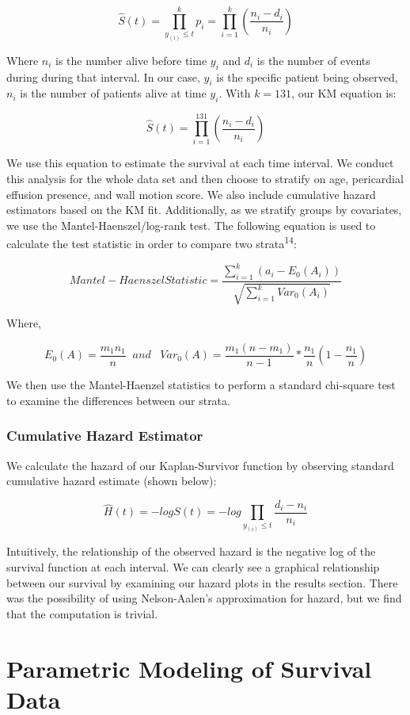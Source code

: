\documentclass[
]{article}
\begin{document}
\[ \hat{S}(t) = \prod_{y_{(i)}\leq{t}}^{k} p_i = \prod_{i=1}^{k} (\frac{n_i -d_i}{n_i}) \]

Where \(n_i\) is the number alive before time \(y_i\) and \(d_i\) is the
number of events during during that interval. In our case, \(y_i\) is
the specific patient being observed, \(n_i\) is the number of patients
alive at time \(y_i\). With \(k = 131\), our KM equation is:

\[ \hat{S}(t) = \prod_{i=1}^{131} (\frac{n_i -d_i}{n_i}) \]

We use this equation to estimate the survival at each time interval. We
conduct this analysis for the whole data set and then choose to stratify
on age, pericardial effusion presence, and wall motion score. We also
include cumulative hazard estimators based on the KM fit. Additionally,
as we stratify groups by covariates, we use the Mantel-Haenszel/log-rank
test. The following equation is used to calculate the test statistic in
order to compare two strata\textsuperscript{14}:

\[ Mantel-Haenszel Statistic = \frac
{\sum_{i=1}^{k} (a_i-E_{0}(A_i))}
{\sqrt{\sum_{i=1}^{k} Var_0 (A_i)}}
\]

Where,

\[E_0(A) = \frac{m_1 n_1}{n} \;\; and \;\;\; Var_0(A) =\frac{m_1(n-m_1)}{n-1}*\frac{n_1}{n}(1-\frac{n_1}{n})\]

We then use the Mantel-Haenzel statistics to perform a standard
chi-square test to examine the differences between our strata.

\hypertarget{cumulative-hazard-estimator}{%
\subsubsection{Cumulative Hazard
Estimator}\label{cumulative-hazard-estimator}}

We calculate the hazard of our Kaplan-Survivor function by observing
standard cumulative hazard estimate (shown below):

\[ \hat{H}(t) = -log S(t) = -log \prod_{y_{(i)}\leq{t}} \frac{d_i - n_i}{n_i}  \]

Intuitively, the relationship of the observed hazard is the negative log
of the survival function at each interval. We can clearly see a
graphical relationship between our survival by examining our hazard
plots in the results section. There was the possibility of using
Nelson-Aalen's approximation for hazard, but we find that the
computation is trivial.

\hypertarget{parametric-modeling-of-survival-data}{%
\section{Parametric Modeling of Survival
Data}\label{parametric-modeling-of-survival-data}}
\end{document}

